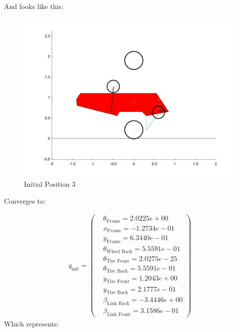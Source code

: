 And looks like this:

\begin{figure}[ht]
    \centering
    \includegraphics[scale=0.235]{images/q_init_3.jpg}
    \caption{Initial Position 3}
    \label{fig:init_3}
\end{figure}

Converges to:

\begin{equation}\label{eq:4.5.6}
    \begin{split}
        q_{\text{init}} = 
        \begin{pmatrix}
            &\theta_{\text{Frame}} = 2.0225e+00\\
            &x_{\text{Frame}} =  -1.2734e-01\\
            &y_{\text{Frame}} = 6.3440e-01\\
            &\theta_{\text{Wheel Back}} = 5.5591e-01\\
            &\theta_{\text{Tire Front}} =  2.0275e-25\\
            &\theta_{\text{Tire Back}} = 5.5591e-01\\
            &y_{\text{Tire Front}} = 1.2043e+00\\
            &y_{\text{Tire Back}} = 2.1777e-01\\
            &\beta_{\text{Link Back}} = -3.4446e+00\\
            &\beta_{\text{Link Front}} = 3.1586e-01
        \end{pmatrix}
    \end{split}
\end{equation}
\clearpage%
Which represents:

